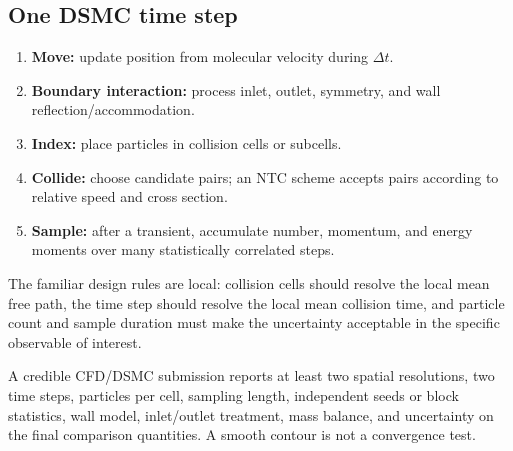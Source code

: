 \documentclass[11pt]{article}
\begin{document}
\subsection{One DSMC time step}
\begin{center}
\end{center}

\begin{enumerate}
\item \textbf{Move:} update position from molecular velocity during $\Delta t$.
\item \textbf{Boundary interaction:} process inlet, outlet, symmetry, and wall reflection/accommodation.
\item \textbf{Index:} place particles in collision cells or subcells.
\item \textbf{Collide:} choose candidate pairs; an NTC scheme accepts pairs according to relative speed and cross section.
\item \textbf{Sample:} after a transient, accumulate number, momentum, and energy moments over many statistically correlated steps.
\end{enumerate}

The familiar design rules are local: collision cells should resolve the local
mean free path, the time step should resolve the local mean collision time,
and particle count and sample duration must make the uncertainty acceptable in
the specific observable of interest.

\begin{evidencebox}
A credible CFD/DSMC submission reports at least two spatial resolutions, two
time steps, particles per cell, sampling length, independent seeds or block
statistics, wall model, inlet/outlet treatment, mass balance, and uncertainty
on the final comparison quantities. A smooth contour is not a convergence test.
\end{evidencebox}
\end{document}
